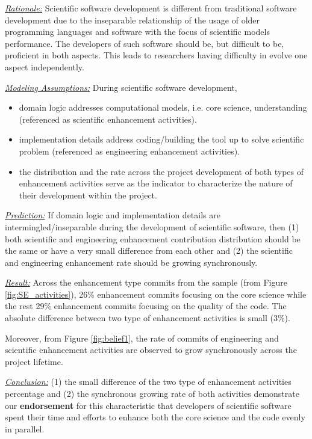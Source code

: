 \documentclass[sigconf,review,anonymous]{acmart}
\newcommand{\bi}{\begin{itemize}}
\newcommand{\ei}{\end{itemize}}
\newenvironment{RQ}{\vspace{1mm}\begin{tcolorbox}[enhanced,width=3.4in,size=fbox,colback=red!5!white,drop shadow southwest,sharp corners]}{\end{tcolorbox}}
\begin{document}
\noindent \textit{\underline{Rationale:}} Scientific software development is different from traditional software development due to the inseparable relationship of the usage of older programming languages and software with the focus of scientific models performance. The developers of such software should be, but difficult to be, proficient in both aspects. This leads to researchers having difficulty in evolve one aspect independently. 

\noindent \textit{\underline{Modeling Assumptions:}} During scientific software development,
\bi
\item domain logic addresses computational models, i.e. core science, understanding (referenced as scientific enhancement activities). 
\item implementation details address coding/building the tool up to solve scientific problem (referenced as engineering enhancement activities). 
\item the distribution and the rate across the project development of both types of enhancement activities serve as the indicator to characterize the nature of their development within the project. 
\ei

\noindent \textit{\underline{Prediction:}} If domain logic and implementation details are intermingled/inseparable during the development of scientific software, then (1) both scientific and engineering enhancement contribution distribution should be the same or have a very small difference from each other and (2) the scientific and engineering enhancement rate should be growing synchronously.  

 \noindent \textit{\underline{Result:}}  Across the enhancement type commits from the sample (from Figure \ref{fig:SE_activities}), 26\% enhancement commits focusing on the core science while the rest 29\% enhancement commits focusing on the quality of the code. The absolute difference between two type of enhancement activities is small (3\%). 
 
Moreover, from Figure \ref{fig:belief1}, the rate of commits of engineering and scientific enhancement activities are observed to grow synchronously across the project lifetime.   
 
\begin{RQ}
\textit{\underline{Conclusion:}} (1) the small difference of the two type of enhancement activities percentage and (2) the synchronous growing rate of both activities demonstrate our \textbf{endorsement} for this characteristic that developers of scientific software spent their time and efforts to enhance both the core science and the code evenly in parallel.
\end{RQ}
\end{document}
